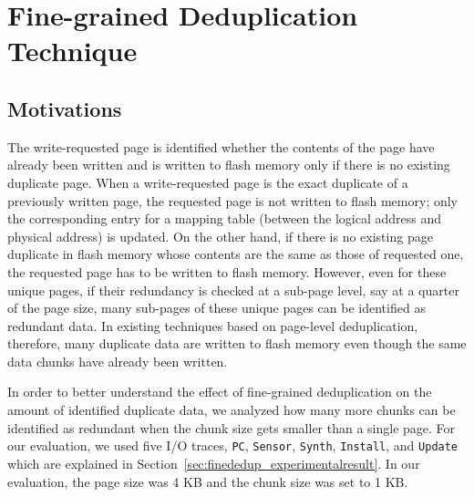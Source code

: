 \chapter{Fine-grained Deduplication Technique} 
\label{chap:FineDedup}

\section{Motivations}
\label{sec:finededup_motivation}

The write-requested page is identified whether the contents of the page have already been written and 
is written to flash memory only if there is no existing duplicate page. 
When a write-requested page is the exact duplicate of a previously written page, 
the requested page is not written to flash memory; 
only the corresponding entry for a mapping table (between the logical address and physical address) is updated. 
On the other hand, if there is no existing page duplicate in flash memory whose contents are the 
same as those of requested one, the requested page has to be written to flash memory. 
However, even for these unique pages, if their redundancy is checked at a sub-page level, 
say at a quarter of the page size, many sub-pages of these unique pages can be identified as redundant data. 
In existing techniques based on page-level deduplication, therefore, 
many duplicate data are written to flash memory even though the same data chunks have already been written.

In order to better understand the effect of fine-grained deduplication on the amount of identified duplicate data,
we analyzed how many more chunks can be identified as redundant 
when the chunk size gets smaller than a single page.
For our evaluation, we used five I/O traces, \texttt{PC}, \texttt{Sensor}, \texttt{Synth}, \texttt{Install}, and \texttt{Update} which are 
explained in Section~\ref{sec:finededup_experimentalresult}.
In our evaluation, the page size was 4 KB and the chunk size was set to 1 KB.

